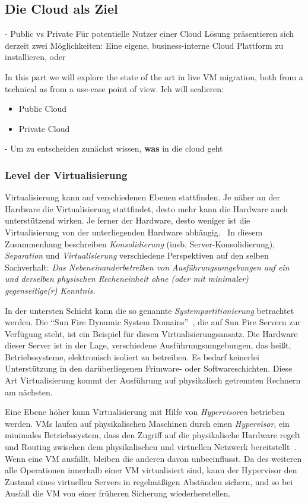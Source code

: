 \subsection{Die Cloud als Ziel}
\label{sec:sota}
- Public vs Private
Für potentielle Nutzer einer Cloud Lösung präsentieren sich derzeit
zwei Möglichkeiten: Eine eigene, business-interne Cloud Plattform zu
installieren, oder 

In this part we will explore the state of the art in live VM
migration, both from a technical as from a use-case point of view.
Ich will scalieren:
\begin{itemize}
\item Public Cloud
\item Private Cloud
\end{itemize}
- Um zu entscheiden zunächst wissen, {\bf was} in die cloud geht

\subsubsection{Level der Virtualisierung}
\label{sec:def-virtualisierung}

Virtualisierung kann auf verschiedenen Ebenen stattfinden. Je näher an
der Hardware die Virtualisierung stattfindet, desto mehr kann die
Hardware auch unterstützend wirken. Je ferner der Hardware, desto
weniger ist die Virtualisierung von der unterliegenden Hardware
abhängig.~\cite{Giesekus2010:Virtualisierung} In diesem Zusammenhang
beschreiben \emph{Konsolidierung} (insb. Server-Konsolidierung),
\emph{Separation} und \emph{Virtualisierung} verschiedene Perspektiven
auf den selben Sachverhalt: \emph{Das Nebeneinanderbetreiben von
Ausführungsumgebungen auf ein und derselben physischen Recheneinheit
ohne (oder mit minimaler) gegenseitige(r) Kenntnis.}

In der untersten Schicht kann die so genannte
\emph{Systempartitionierung} betrachtet werden. Die "`Sun Fire Dynamic
System Domains"'~\cite{Shoumack2007:Beginners-Guid-}, die auf Sun Fire
Servern zur Verfügung steht, ist ein Beispiel für diesen
Virtualisierungsansatz. Die Hardware dieser Server ist in der Lage,
verschiedene Ausführungsumgebungen, das heißt, Betriebssysteme,
elektronisch isoliert zu betreiben. Es bedarf keinerlei Unterstützung
in den darüberliegenen Frimware- oder Softwareschichten. Diese Art
Virtualisierung kommt der Ausführung auf physikalisch getrennten
Rechnern am nächsten.

Eine Ebene höher kann Virtualisierung mit Hilfe von
\emph{Hypervisoren} betrieben werden. \acfp{VM} laufen auf
physikalischen Maschinen durch einen \emph{Hypervisor}, ein minimales
Betriebssystem, dass den Zugriff auf die physikalische Hardware regelt
und Routing zwischen dem physikalischen und virtuellen Netzwerk
bereitstellt~\cite{tanenbaum1992modern}. Wenn eine \ac{VM} ausfällt,
bleiben die anderen davon unbeeinflusst. Da des weiteren alle
Operationen innerhalb einer \ac{VM} virtualisiert sind, kann der Hypervisor
den Zustand eines virtuellen Servers in regelmäßigen Abständen
sichern, und so bei Ausfall die \ac{VM} von einer früheren Sicherung
wiederherstellen.

